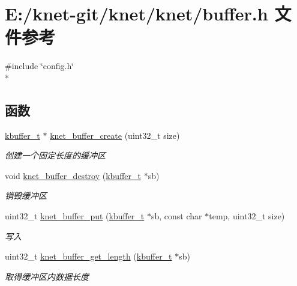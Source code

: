 \hypertarget{a00050}{}\section{E\+:/knet-\/git/knet/knet/buffer.h 文件参考}
\label{a00050}
{\ttfamily \#include \char`\"{}config.\+h\char`\"{}}\\*
\subsection*{函数}
\begin{DoxyCompactItemize}
\item 
\hyperlink{a00056_a4b09a7574cd440f9b94285ab73c81b4e_a4b09a7574cd440f9b94285ab73c81b4e}{kbuffer\+\_\+t} $\ast$ \hyperlink{a00050_ab7c640d7d31868f39679942dafd12175_ab7c640d7d31868f39679942dafd12175}{knet\+\_\+buffer\+\_\+create} (uint32\+\_\+t size)
\begin{DoxyCompactList}\small\item\em 创建一个固定长度的缓冲区 \end{DoxyCompactList}\item 
void \hyperlink{a00050_ad7934fdee7f0eea3f1581b5dd94736e2_ad7934fdee7f0eea3f1581b5dd94736e2}{knet\+\_\+buffer\+\_\+destroy} (\hyperlink{a00056_a4b09a7574cd440f9b94285ab73c81b4e_a4b09a7574cd440f9b94285ab73c81b4e}{kbuffer\+\_\+t} $\ast$sb)
\begin{DoxyCompactList}\small\item\em 销毁缓冲区 \end{DoxyCompactList}\item 
uint32\+\_\+t \hyperlink{a00050_abf453d69e41199e1f64314d31ff23a69_abf453d69e41199e1f64314d31ff23a69}{knet\+\_\+buffer\+\_\+put} (\hyperlink{a00056_a4b09a7574cd440f9b94285ab73c81b4e_a4b09a7574cd440f9b94285ab73c81b4e}{kbuffer\+\_\+t} $\ast$sb, const char $\ast$temp, uint32\+\_\+t size)
\begin{DoxyCompactList}\small\item\em 写入 \end{DoxyCompactList}\item 
uint32\+\_\+t \hyperlink{a00050_a8d22cd2f8625aee29cbf263e0fba8cef_a8d22cd2f8625aee29cbf263e0fba8cef}{knet\+\_\+buffer\+\_\+get\+\_\+length} (\hyperlink{a00056_a4b09a7574cd440f9b94285ab73c81b4e_a4b09a7574cd440f9b94285ab73c81b4e}{kbuffer\+\_\+t} $\ast$sb)
\begin{DoxyCompactList}\small\item\em 取得缓冲区内数据长度 \end{DoxyCompactList}\item 

\end{DoxyCompactItemize}
